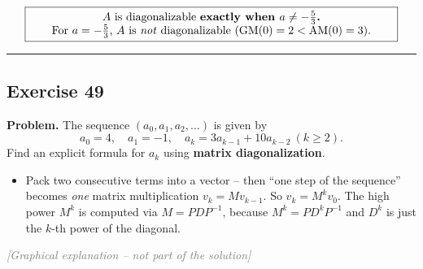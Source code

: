 \documentclass[a4paper,12pt]{article}
\newcommand{\grafik}{\textcolor{gray}{\small\textit{[Graphical explanation -- not part of the solution]}}}
\begin{document}
\[
\fbox{\parbox{0.93\textwidth}{\centering
$A$ is diagonalizable \textbf{exactly when $a \neq -\tfrac{5}{3}$.} \\
For $a = -\tfrac{5}{3}$, $A$ is \emph{not} diagonalizable ($\text{GM}(0)=2 < \text{AM}(0)=3$).
}}
\]

\bigskip
\hrule
\bigskip

\subsection*{Exercise 49}

\textbf{Problem.} The sequence $(a_0, a_1, a_2, \dots)$ is given by
\[
a_0 = 4, \quad a_1 = -1, \quad a_k = 3a_{k-1} + 10 a_{k-2} \ (k \ge 2).
\]
Find an explicit formula for $a_k$ using \textbf{matrix diagonalization}.

\begin{wastun}
\begin{itemize}[leftmargin=*, nosep]
    \item Pack two consecutive terms into a vector -- then ``one step of the sequence'' becomes \emph{one} matrix multiplication $v_k = M v_{k-1}$. So $v_k = M^k v_0$. The high power $M^k$ is computed via $M = PDP^{-1}$, because $M^k = P D^k P^{-1}$ and $D^k$ is just the $k$-th power of the diagonal.
\end{itemize}
\end{wastun}

\grafik

\begin{center}
\end{center}
\end{document}

